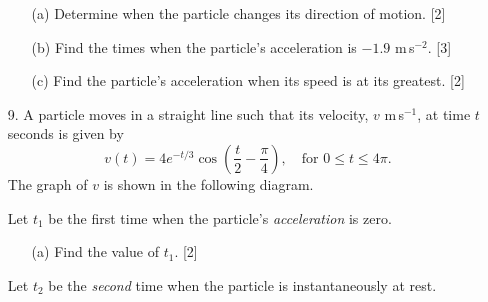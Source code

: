 \documentclass[12pt, twoside]{article}
\begin{document}
\begin{enumerate}[itemsep=0.15cm]
\begin{enumerate}[itemsep=0.1cm]
  \item[(a)] Determine when the particle changes its direction of motion. \hfill [2]
  \item[(b)] Find the times when the particle's acceleration is $-1.9$ m\,s$^{-2}$. \hfill [3]
  \item[(c)] Find the particle's acceleration when its speed is at its greatest. \hfill [2]
\end{enumerate}


\newpage

\item[9.] A particle moves in a straight line such that its velocity, $v$ m\,s$^{-1}$, at
time $t$ seconds is given by
\[v(t) = 4e^{-t/3}\cos\!\left(\frac{t}{2} - \frac{\pi}{4}\right),
\quad \text{for } 0 \leq t \leq 4\pi.\]
The graph of $v$ is shown in the following diagram.

\begin{center}
\end{center}
\vspace{-0.3cm}

Let $t_1$ be the first time when the particle's \emph{acceleration} is zero.

\begin{enumerate}[itemsep=0.1cm]
  \item[(a)] Find the value of $t_1$. \hfill [2]
\end{enumerate}

Let $t_2$ be the \emph{second} time when the particle is instantaneously at rest.


\end{enumerate}
\end{document}
